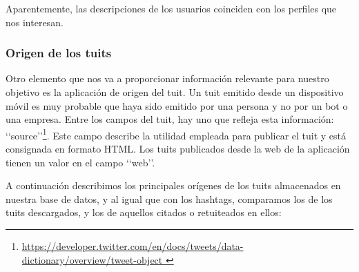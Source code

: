 

Aparentemente, las descripciones de los usuarios coinciden con los perfiles que nos interesan.

\subsubsection{Origen de los tuits}
Otro elemento que nos va a proporcionar información relevante para nuestro objetivo
es la aplicación de origen del tuit. Un tuit emitido desde un dispositivo móvil es muy
probable que haya sido emitido por una persona y no por un bot o una empresa. 
Entre los campos del tuit, hay uno que refleja esta información: \lq\lq source\rq\rq\footnote{
\url{https://developer.twitter.com/en/docs/tweets/data-dictionary/overview/tweet-object }}.
Este campo describe la utilidad empleada para publicar el tuit y 
está consignada en formato HTML. Los tuits publicados desde la web
de la aplicación tienen un valor en el campo \lq\lq web\rq\rq.

A continuación describimos los principales orígenes de los tuits almacenados en 
nuestra base de datos, y al igual que con los hashtags, comparamos los de los tuits
descargados, y los de aquellos citados o retuiteados en ellos:


